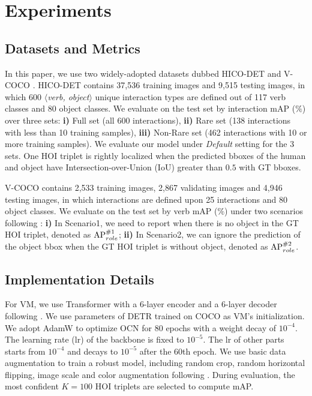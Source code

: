 \documentclass[letterpaper]{article} %
\begin{document}
\section{Experiments}
\subsection{Datasets and Metrics} 
In this paper, we use two widely-adopted datasets dubbed HICO-DET \cite{chao2015hico} and V-COCO \cite{gupta2015VisualSemanticRole}. HICO-DET contains 37,536 training images and 9,515 testing images, in which 600 $\langle$\textit{verb, object}$\rangle$ unique interaction types are defined out of 117 verb classes and 80 object classes. We evaluate on the test set by interaction mAP ($\%$) over three sets: \textbf{i)} Full set (all 600 interactions), \textbf{ii)} Rare set (138 interactions with less than 10 training samples), \textbf{iii)} Non-Rare set (462 interactions with 10 or more training samples). We evaluate our model under \textit{Default} setting for the 3 sets. One HOI triplet is rightly localized when the predicted bboxes of the human and object have Intersection-over-Union (IoU) greater than $0.5$ with GT bboxes. 

V-COCO contains 2,533 training images, 2,867 validating images and 4,946 testing images, in which interactions are defined upon 25 interactions and 80 object classes. We evaluate on the test set by verb mAP ($\%$) under two scenarios following \cite{kim2021hotr,tamura2021qpic}: \textbf{i)} In Scenario1, we need to report when there is no object in the GT HOI triplet, denoted as ${\rm AP}_{role}^{\#1}$; \textbf{ii)} In Scenario2, we can ignore the prediction of the object bbox when the GT HOI triplet is without object, denoted as ${\rm AP}_{role}^{\#2}$.


\subsection{Implementation Details} For VM, we use Transformer with a 6-layer encoder and a 6-layer decoder following \cite{carion2020DETR}. We use parameters of DETR trained on COCO \cite{lin2014MSCOCO} as VM's initialization. We adopt AdamW \cite{loshchilov2018adamW} to optimize OCN for $80$ epochs with a weight decay of $10^{-4}$. The learning rate (lr) of the backbone is fixed to $10^{-5}$. The lr of other parts starts from $10^{-4}$ and decays to $10^{-5}$ after the $60$th epoch. We use basic data augmentation to train a robust model, including random crop, random horizontal flipping, image scale and color augmentation following \cite{carion2020DETR,liao2020ppdm}. During evaluation, the most confident $K = 100$ HOI triplets are selected to compute mAP. 
\end{document}
